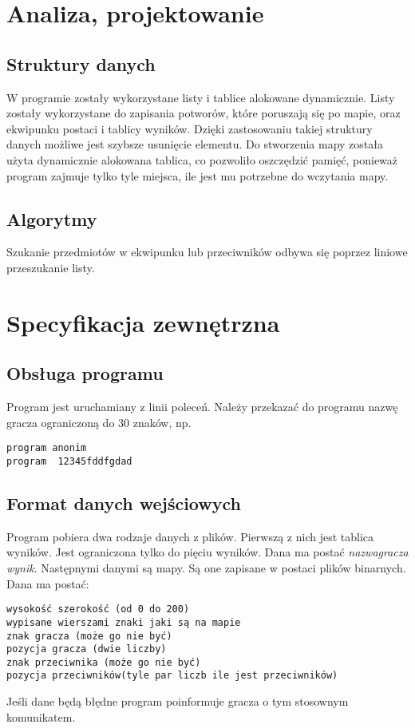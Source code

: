 \documentclass[12pt,a4paper,twoside]{article}
\newcounter{rok}
\begin{document}
\section{Analiza, projektowanie}


\subsection{Struktury danych}
W programie zostały wykorzystane listy i tablice alokowane dynamicznie. Listy zostały wykorzystane do zapisania potworów, które poruszają się po mapie, oraz ekwipunku postaci i tablicy wyników. Dzięki zastosowaniu takiej struktury danych możliwe jest szybsze usunięcie elementu. Do stworzenia mapy została użyta dynamicznie alokowana tablica, co pozwoliło oszczędzić pamięć, ponieważ program zajmuje tylko tyle miejsca, ile jest mu potrzebne do wczytania mapy.

\subsection{Algorytmy}
Szukanie przedmiotów w ekwipunku lub przeciwników odbywa się poprzez liniowe przeszukanie listy.


\section{Specyfikacja zewnętrzna}
\label{sec:sp:zewnetrzna}
\subsection{Obsługa programu}
Program jest uruchamiany z linii poleceń. Należy przekazać do programu nazwę gracza ograniczoną do 30 znaków, np.
\begin{verbatim}
program anonim
program  12345fddfgdad 
\end{verbatim}

\subsection{Format danych wejściowych}
Program pobiera dwa rodzaje danych z plików. Pierwszą z nich jest tablica wyników. Jest ograniczona tylko do pięciu wyników. Dana ma postać \textit{nazwagracza wynik}.
Następnymi danymi są mapy. Są one zapisane w postaci plików binarnych. Dana ma postać: 
\begin{verbatim}
wysokość szerokość (od 0 do 200)
wypisane wierszami znaki jaki są na mapie
znak gracza (może go nie być)
pozycja gracza (dwie liczby)
znak przeciwnika (może go nie być)
pozycja przeciwników(tyle par liczb ile jest przeciwników)
\end{verbatim}
Jeśli dane będą błędne program poinformuje gracza o tym stosownym komunikatem.
\end{document}
